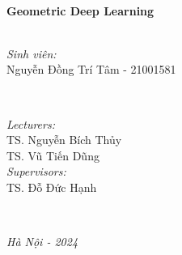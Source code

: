 \begin{titlepage}

\HRule \\[0.4cm]
{ \large \bfseries Geometric Deep Learning}\\[0.4cm] 
\HRule \\[1.5cm]
 

\begin{minipage}{0.475\textwidth}
\vspace{-2cm}
\begin{flushleft} \large
\emph{Sinh viên:}\\
Nguyễn Đồng Trí Tâm - 21001581 \\
\end{flushleft}
\end{minipage}
~
\begin{minipage}{0.495\textwidth}
\begin{flushleft} \large
\hspace{1cm}\emph{Lecturers:} \\
\hspace{2cm}TS. Nguyễn Bích Thủy\\
\hspace{2cm}TS. Vũ Tiến Dũng\\
\hspace{1cm}\emph{Supervisors:} \\
\hspace{2cm}TS. Đỗ Đức Hạnh\\



\end{flushleft}
\end{minipage}\\[2cm]




\vfill 
\centerline{\large \sl Hà Nội - 2024}
\end{titlepage}